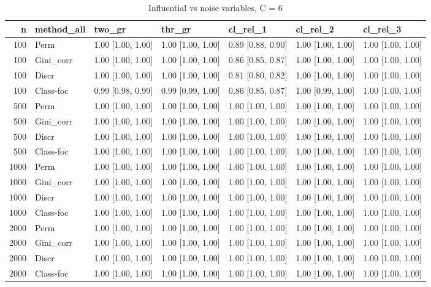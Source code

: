 \begin{table}[ht]
\centering
\caption{Influential vs noise variables, C = 6} 
\begin{tabular}{rllllll}
  \hline
n & method\_all & two\_gr & thr\_gr & cl\_rel\_1 & cl\_rel\_2 & cl\_rel\_3 \\ 
  \hline
100 & Perm & 1.00 [1.00, 1.00] & 1.00 [1.00, 1.00] & 0.89 [0.88, 0.90] & 1.00 [1.00, 1.00] & 1.00 [1.00, 1.00] \\ 
  100 & Gini\_corr & 1.00 [1.00, 1.00] & 1.00 [1.00, 1.00] & 0.86 [0.85, 0.87] & 1.00 [1.00, 1.00] & 1.00 [1.00, 1.00] \\ 
  100 & Discr & 1.00 [1.00, 1.00] & 1.00 [1.00, 1.00] & 0.81 [0.80, 0.82] & 1.00 [1.00, 1.00] & 1.00 [1.00, 1.00] \\ 
  100 & Class-foc & 0.99 [0.98, 0.99] & 0.99 [0.99, 1.00] & 0.86 [0.85, 0.87] & 1.00 [0.99, 1.00] & 1.00 [1.00, 1.00] \\ 
   \hline 500 & Perm & 1.00 [1.00, 1.00] & 1.00 [1.00, 1.00] & 1.00 [1.00, 1.00] & 1.00 [1.00, 1.00] & 1.00 [1.00, 1.00] \\ 
  500 & Gini\_corr & 1.00 [1.00, 1.00] & 1.00 [1.00, 1.00] & 1.00 [1.00, 1.00] & 1.00 [1.00, 1.00] & 1.00 [1.00, 1.00] \\ 
  500 & Discr & 1.00 [1.00, 1.00] & 1.00 [1.00, 1.00] & 1.00 [1.00, 1.00] & 1.00 [1.00, 1.00] & 1.00 [1.00, 1.00] \\ 
  500 & Class-foc & 1.00 [1.00, 1.00] & 1.00 [1.00, 1.00] & 1.00 [1.00, 1.00] & 1.00 [1.00, 1.00] & 1.00 [1.00, 1.00] \\ 
   \hline 1000 & Perm & 1.00 [1.00, 1.00] & 1.00 [1.00, 1.00] & 1.00 [1.00, 1.00] & 1.00 [1.00, 1.00] & 1.00 [1.00, 1.00] \\ 
  1000 & Gini\_corr & 1.00 [1.00, 1.00] & 1.00 [1.00, 1.00] & 1.00 [1.00, 1.00] & 1.00 [1.00, 1.00] & 1.00 [1.00, 1.00] \\ 
  1000 & Discr & 1.00 [1.00, 1.00] & 1.00 [1.00, 1.00] & 1.00 [1.00, 1.00] & 1.00 [1.00, 1.00] & 1.00 [1.00, 1.00] \\ 
  1000 & Class-foc & 1.00 [1.00, 1.00] & 1.00 [1.00, 1.00] & 1.00 [1.00, 1.00] & 1.00 [1.00, 1.00] & 1.00 [1.00, 1.00] \\ 
   \hline 2000 & Perm & 1.00 [1.00, 1.00] & 1.00 [1.00, 1.00] & 1.00 [1.00, 1.00] & 1.00 [1.00, 1.00] & 1.00 [1.00, 1.00] \\ 
  2000 & Gini\_corr & 1.00 [1.00, 1.00] & 1.00 [1.00, 1.00] & 1.00 [1.00, 1.00] & 1.00 [1.00, 1.00] & 1.00 [1.00, 1.00] \\ 
  2000 & Discr & 1.00 [1.00, 1.00] & 1.00 [1.00, 1.00] & 1.00 [1.00, 1.00] & 1.00 [1.00, 1.00] & 1.00 [1.00, 1.00] \\ 
  2000 & Class-foc & 1.00 [1.00, 1.00] & 1.00 [1.00, 1.00] & 1.00 [1.00, 1.00] & 1.00 [1.00, 1.00] & 1.00 [1.00, 1.00] \\ 
   \hline
\end{tabular}
\end{table}
